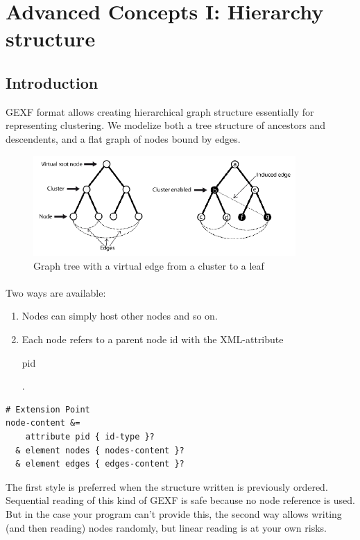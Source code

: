 \documentclass[a4paper,10pt]{article}
\begin{document}
\section{Advanced Concepts I: Hierarchy structure} \label{hierarchy}

\subsection{Introduction}

GEXF format allows creating hierarchical graph structure essentially for representing clustering. We modelize both a tree structure of ancestors and descendents, and a flat graph of nodes bound by edges.

\begin{figure}[!ht]
  \begin{center}
  \includegraphics[width=10cm,keepaspectratio=true]{res/hierarchy.png}
  \caption{Graph tree with a virtual edge from a cluster to a leaf}
  \end{center}
\end{figure}

\paragraph{}
Two ways are available:
\begin{enumerate}
 \item Nodes can simply host other nodes and so on.
 \item Each node refers to a parent node id with the XML-attribute \begin{footnotesize}pid\end{footnotesize}.
\end{enumerate}

\lstset{ style=rnc }
\begin{lstlisting}[caption={Hierarchy Specification},label=hierarchyRNC]
# Extension Point
node-content &=
    attribute pid { id-type }?
  & element nodes { nodes-content }?
  & element edges { edges-content }?
\end{lstlisting}

The first style is preferred when the structure written is previously ordered. Sequential reading of this kind of GEXF is safe because no node reference is used. But in the case your program can't provide this, the second way allows writing (and then reading) nodes randomly, but linear reading is at your own risks.
\end{document}
